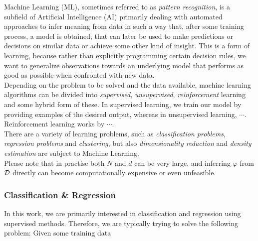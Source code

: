 Machine Learning (ML), sometimes referred to as \emph{pattern recognition}, is a subfield of Artificial Intelligence (AI) primarily dealing with automated approaches to infer meaning from data in such a way that, after some training process, a model is obtained, that can later be used to make predictions or decisions on similar data or achieve some other kind of insight. This is a form of learning, because rather than explicitly programming certain decision rules, we want to generalize observations towards an underlying model that performs as good as possible when confronted with new data.\\

Depending on the problem to be solved and the data available, machine learning algorithms can be divided into \emph{supervised}, \emph{unsupervised}, \emph{reinforcement} learning and some hybrid form of these. In supervised learning, we train our model by providing examples of the desired output, whereas in unsupervised learning, $\cdots$. \todo{} Reinforcement learning works by $\cdots$.\\

There are a variety of learning problems, such as \emph{classification problems}, \emph{regression problems} and \emph{clustering}, but also \emph{dimensionality reduction} and \emph{density estimation} are subject to Machine Learning.\\


Please note that in practise both $N$ and $d$ can be very large, and inferring $\varphi$ from $\mathcal{D}$ directly can become computationally expensive or even unfeasible.

\subsubsection{Classification \& Regression}

In this work, we are primarily interested in classification and regression using supervised methods. Therefore, we are typically trying to solve the following problem: Given some training data


